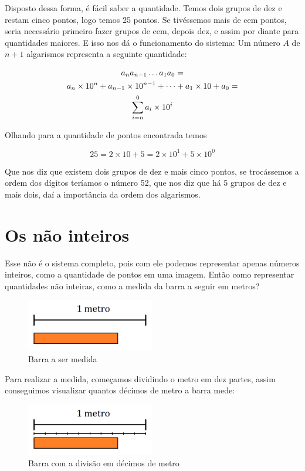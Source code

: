 \documentclass{report}
\theoremstyle{definition}
\begin{document}
Disposto dessa forma, é fácil saber a quantidade. Temos dois grupos de dez e restam cinco pontos, logo temos 25 pontos. Se tivéssemos mais de cem pontos, seria necessário primeiro fazer grupos de cem, depois dez, e assim por diante para quantidades maiores.
E isso nos dá o funcionamento do sistema: Um número $A$ de $n+1$ algarismos representa a seguinte quantidade:

\begin{gather}
a_{n}a_{n-1} \ldots a_{1}a_{0} = \notag\\
a_{n} \times 10^{n} + a_{n-1} \times 10^{n-1} + \cdots + a_{1} \times 10 + a_{0} = \notag\\
\sum_{i=n}^{0}a_i \times 10^i
\end{gather}

Olhando para a quantidade de pontos encontrada temos

\begin{equation*}
25 = 2 \times 10 + 5 = 2 \times 10^1 + 5 \times 10^0
\end{equation*}

Que nos diz que existem dois grupos de dez e mais cinco pontos, se trocássemos a ordem dos dígitos teríamos o número 52, que nos diz que há 5 grupos de dez e mais dois, daí a importância da ordem dos algarismos.
\section{Os não inteiros}

Esse não é o sistema completo, pois com ele podemos representar apenas números inteiros, como a quantidade de pontos em uma imagem. Então como representar quantidades não inteiras, como a medida da barra a seguir em metros?

\begin{figure}[H]
    \centering
    \includegraphics[width=0.5\textwidth]{imgs/barra_1.png}
    \caption{Barra a ser medida}
\end{figure}

Para realizar a medida, começamos dividindo o metro em dez partes, assim conseguimos visualizar quantos décimos de metro a barra mede:

\begin{figure}[H]
    \centering
    \includegraphics[width=0.5\textwidth]{imgs/barra_2.png}
    \caption{Barra com a divisão em décimos de metro}
\end{figure}
\end{document}
